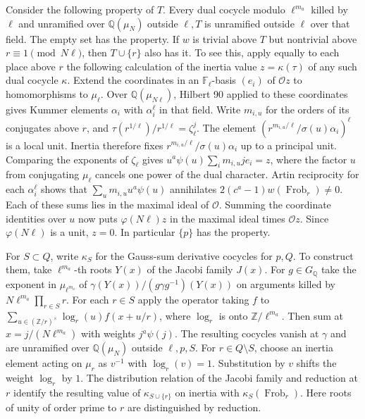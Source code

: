 Consider the following property of \(T\). Every dual cocycle modulo \(\ell^{m_a}\) killed by
\(\ell\) and unramified over \(\mathbb Q(\mu_N)\) outside \(\ell,T\) is unramified outside \(\ell\)
over that field. The empty set has the property. If \(w\) is trivial above \(T\) but nontrivial
above \(r\equiv1\pmod{N\ell}\), then \(T\cup\{r\}\) also has it. To see this, apply equally to
each place above \(r\) the following calculation of the inertia value \(z=\kappa(\tau)\)
of any such dual cocycle \(\kappa\). Extend the coordinates in an \(\mathbb F_\ell\)-basis
\((e_i)\) of \(\mathcal Oz\) to homomorphisms to \(\mu_\ell\).
Over \(\mathbb Q(\mu_{N\ell})\), Hilbert 90 applied to these coordinates gives
Kummer elements \(\alpha_i\) with \(\alpha_i^\ell\) in that field.
Write \(m_{i,u}\) for the orders of its conjugates above \(r\), and
\(\tau(r^{1/\ell})/r^{1/\ell}=\zeta_\ell^j\).
The element \((r^{m_{i,u}/\ell}/\sigma(u)\alpha_i)^\ell\) is a local unit.
Inertia therefore fixes \(r^{m_{i,u}/\ell}/\sigma(u)\alpha_i\) up to a principal unit.
Comparing the exponents of \(\zeta_\ell\) gives
\(u^a\psi(u)\sum_i m_{i,u}j e_i=z\), where the factor \(u\) from conjugating
\(\mu_\ell\) cancels one power of the dual character.
Artin reciprocity for each \(\alpha_i^\ell\) shows that
\(\sum_u m_{i,u}u^a\psi(u)\) annihilates \(2(c^a-1)w(\operatorname{Frob}_r)\ne0\).
Each of these sums lies in the maximal ideal of \(\mathcal O\).
Summing the coordinate identities over \(u\) now puts
\(\varphi(N\ell)z\) in the maximal ideal times \(\mathcal Oz\).
Since \(\varphi(N\ell)\) is a unit, \(z=0\). In particular \(\{p\}\) has the property.

For \(S\subset Q\), write \(\kappa_S\) for the Gauss-sum derivative cocycles for \(p,Q\).
To construct them, take \(\ell^{m_a}\)-th roots \(Y(x)\) of the Jacobi family \(J(x)\).
For \(g\in G_{\mathbb Q}\) take the exponent in \(\mu_{\ell^{m_a}}\) of
\(\gamma(Y(x))/(g\gamma g^{-1})(Y(x))\) on arguments killed by \(N\ell^{m_a}\prod_{r\in S}r\).
For each \(r\in S\) apply the operator taking \(f\) to
\(\sum_{u\in(\mathbb Z/r)^\times}\log_r(u)f(x+u/r)\), where \(\log_r\) is onto
\(\mathbb Z/\ell^{m_a}\). Then sum at \(x=j/(N\ell^{m_a})\) with weights \(j^a\psi(j)\).
The resulting cocycles vanish at \(\gamma\) and are unramified over \(\mathbb Q(\mu_N)\)
outside \(\ell,p,S\). For \(r\in Q\setminus S\), choose an inertia element acting on \(\mu_r\)
as \(v^{-1}\) with \(\log_r(v)=1\). Substitution by \(v\) shifts the weight \(\log_r\) by \(1\).
The distribution relation of the Jacobi family and reduction at \(r\) identify the resulting
value of \(\kappa_{S\cup\{r\}}\) on inertia with \(\kappa_S(\operatorname{Frob}_r)\).
Here roots of unity of order prime to \(r\) are distinguished by reduction.

